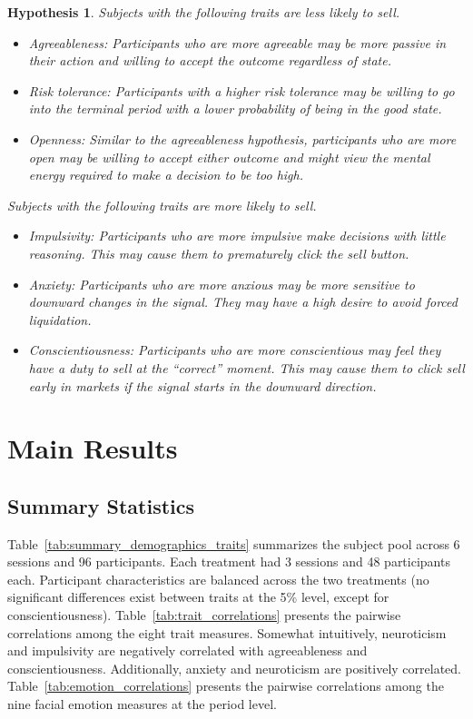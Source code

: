 \documentclass[11pt]{article}
\newtheorem{hypothesis}{Hypothesis}
\begin{document}
\begin{hypothesis}\label{chat_treatment}
    Subjects with the following traits are less likely to sell. 
    \begin{itemize}
        \item Agreeableness: Participants who are more agreeable may be more passive in their action and willing to accept the outcome regardless of state.
        \item Risk tolerance: Participants with a higher risk tolerance may be willing to go into the terminal period with a lower probability of being in the good state.
        \item Openness: Similar to the agreeableness hypothesis, participants who are more open may be willing to accept either outcome and might view the mental energy required to make a decision to be too high.
    \end{itemize}
    Subjects with the following traits are more likely to sell.
    \begin{itemize}
        \item Impulsivity: Participants who are more impulsive make decisions with little reasoning. This may cause them to prematurely click the sell button.
        \item Anxiety: Participants who are more anxious may be more sensitive to downward changes in the signal. They may have a high desire to avoid forced liquidation.
        \item Conscientiousness: Participants who are more conscientious may feel they have a duty to sell at the ``correct'' moment. This may cause them to click sell early in markets if the signal starts in the downward direction.
    \end{itemize}
\end{hypothesis}

\section{Main Results}

\subsection{Summary Statistics}

Table~\ref{tab:summary_demographics_traits} summarizes the subject pool across 6 sessions and 96 participants. Each treatment had 3 sessions and 48 participants each. Participant characteristics are balanced across the two treatments (no significant differences exist between traits at the 5\% level, except for conscientiousness). Table~\ref{tab:trait_correlations} presents the pairwise correlations among the eight trait measures. Somewhat intuitively, neuroticism and impulsivity  are negatively correlated with agreeableness and conscientiousness. Additionally, anxiety and neuroticism are positively correlated. Table~\ref{tab:emotion_correlations} presents the pairwise correlations among the nine facial emotion measures at the period level.
\end{document}
